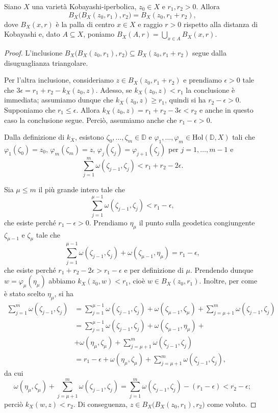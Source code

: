 \begin{lm} \label{ballball}
    Siano $X$ una varietà Kobayashi-iperbolica, $z_0 \in X$ e $r_1,r_2>0$. Allora
    $$B_X\big(B_X(z_0,r_1),r_2\big)=B_X(z_0,r_1+r_2),$$
    dove $B_X(x,r)$ è la palla di centro $x \in X$ e raggio $r>0$ rispetto alla distanza di Kobayashi e, dato $A\subseteq X$, poniamo $B_X(A,r)=\displaystyle\bigcup_{x \in A}B_X(x,r)$.
\end{lm}
\begin{proof}
    L'inclusione $B_X\big(B_X(z_0,r_1),r_2\big)\subseteq B_X(z_0,r_1+r_2)$ segue dalla disuguaglianza triangolare.

    Per l'altra inclusione, consideriamo $z \in B_X(z_0,r_1+r_2)$ e prendiamo $\epsilon>0$ tale che $3\epsilon=r_1+r_2-k_X(z_0,z)$. Adesso, se $k_X(z_0,z)<r_1$ la conclusione è immediata; assumiamo dunque che $k_X(z_0,z)\ge r_1$, quindi si ha $r_2-\epsilon>0$. Supponiamo che $r_1 \le \epsilon$. Allora $k_X(z_0,z)=r_1+r_2-3\epsilon<r_2$ e anche in questo caso la conclusione segue. Perciò, assumiamo anche che $r_1-\epsilon>0$.

    Dalla definizione di $k_X$, esistono $\zeta_0,\dots,\zeta_m \in \mathbb{D}$ e $\varphi_1,\dots,\varphi_m \in \text{Hol}(\mathbb{D},X)$ tali che $\varphi_1(\zeta_0)=z_0$, $\varphi_m(\zeta_m)=z$, $\varphi_j(\zeta_j)=\varphi_{j+1}(\zeta_j)$ per $j=1,\dots,m-1$ e
    $$\sum_{j=1}^m \omega(\zeta_{j-1},\zeta_j)<r_1+r_2-2\epsilon.$$

    Sia $\mu \le m$ il più grande intero tale che
    $$\sum_{j=1}^{\mu-1} \omega(\zeta_{j-1},\zeta_j)<r_1-\epsilon,$$
    che esiste perché $r_1-\epsilon>0$. Prendiamo $\eta_{\mu}$ il punto sulla geodetica congiungente $\zeta_{\mu-1}$ e $\zeta_{\mu}$ tale che
    $$\sum_{j=1}^{\mu-1} \omega(\zeta_{j-1},\zeta_j)+\omega(\zeta_{\mu-1},\eta_{\mu})=r_1-\epsilon,$$
    che esiste perché $r_1+r_2-2\epsilon>r_1-\epsilon$ e per definizione di $\mu$. Prendendo dunque $w=\varphi_{\mu}(\eta_{\mu})$ abbiamo $k_X(z_0,w)<r_1$, cioè $w\in B_X(z_0,r_1)$. Inoltre, per come è stato scelto $\eta_{\mu}$, si ha
    \begin{align*}
        \sum_{j=1}^m \omega(\zeta_{j-1},\zeta_j)&=\sum_{j=1}^{\mu-1} \omega(\zeta_{j-1},\zeta_j)+\omega(\zeta_{\mu-1},\zeta_{\mu})+\sum_{j=\mu+1}^m \omega(\zeta_{j-1},\zeta_j)\\
        &=\sum_{j=1}^{\mu-1} \omega(\zeta_{j-1},\zeta_j)+\omega(\zeta_{\mu-1},\eta_{\mu})+\\
        &+\omega(\eta_{\mu},\zeta_{\mu})+\sum_{j=\mu+1}^m \omega(\zeta_{j-1},\zeta_j)\\
        &=r_1-\epsilon+\omega(\eta_{\mu},\zeta_{\mu})+\sum_{j=\mu+1}^m \omega(\zeta_{j-1},\zeta_j),
    \end{align*}
    da cui
    $$\omega(\eta_{\mu},\zeta_{\mu})+\sum_{j=\mu+1}^m \omega(\zeta_{j-1},\zeta_j)=\sum_{j=1}^m \omega(\zeta_{j-1},\zeta_j)-(r_1-\epsilon)<r_2-\epsilon;$$
    perciò $k_X(w,z)<r_2$. Di conseguenza, $z \in B_X\big(B_X(z_0,r_1),r_2\big)$ come voluto.
\end{proof}

